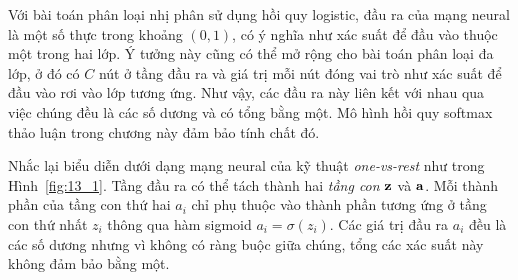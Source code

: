 Với bài toán phân loại nhị phân sử dụng hồi quy logistic, đầu ra của mạng neural
là một số thực trong khoảng $(0, 1)$, có ý nghĩa như xác suất để đầu vào thuộc
một trong hai lớp. Ý tưởng này cũng có thể mở rộng cho bài toán phân loại đa
lớp, ở đó có $C$ nút ở tầng đầu ra và giá trị mỗi nút đóng vai trò như xác
suất để đầu vào rơi vào lớp tương ứng. Như vậy, các đầu ra này liên kết với nhau
qua việc chúng đều là các số dương và có tổng bằng một. Mô hình hồi quy softmax
thảo luận trong chương này đảm bảo tính chất đó.

Nhắc lại biểu diễn dưới dạng mạng neural của kỹ thuật \textit{one-vs-rest} như
trong Hình~\ref{fig:13_1}. Tầng đầu ra có thể tách thành hai \textit{tầng con}
$\mathbf{z}$ và $\mathbf{a}$. Mỗi thành phần của tầng con thứ hai $a_i$ chỉ phụ thuộc vào
thành phần tương ứng ở tầng con thứ nhất $z_i$ thông qua hàm sigmoid $a_i =
\sigma(z_i)$. Các giá trị đầu ra $a_i$ đều là các số dương nhưng vì không có
ràng buộc giữa chúng, tổng các xác suất này không đảm bảo bằng một.






